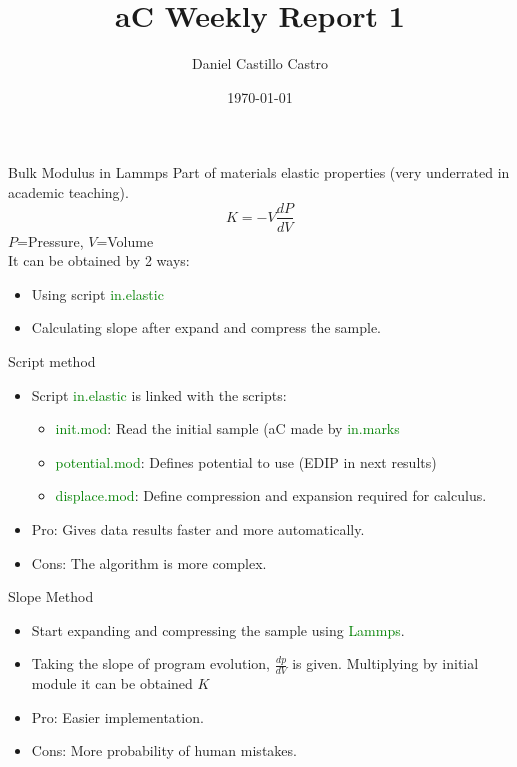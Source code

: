 \documentclass[11pt]{beamer}
\date{\today}
\author[Dacastillo]{Daniel Castillo Castro}
\begin{document}
\everymath{\color{blue}}
\everydisplay{\color{blue}}
\title[aC-WR1]{aC Weekly Report 1} 
\begin{frame}
\titlepage 
\end{frame}
\begin{frame}{Bulk Modulus in Lammps}
Part of materials elastic properties (very underrated in academic teaching).
\begin{equation} \label{Bulk} K=-V\frac{dP}{dV}\end{equation}
$P$=Pressure, $V$=Volume \\
It can be obtained by 2 ways:
\begin{itemize}
    \item Using script \textcolor{green}{in.elastic} 
    \item Calculating slope after expand and compress the sample.
\end{itemize}
\end{frame}
\begin{frame}{Script method}
\begin{itemize}
    \item Script \textcolor{green}{in.elastic} is linked with the scripts:
    \begin{itemize}
        \item \textcolor{green}{init.mod}: Read the initial sample (aC made by \textcolor{green}{in.marks}
        \item \textcolor{green}{potential.mod}: Defines potential to use (EDIP in next results)
        \item \textcolor{green}{displace.mod}: Define compression and expansion required for calculus.
    \end{itemize}
    \item Pro: Gives data results faster and more automatically.
    \item Cons: The algorithm is more complex.
\end{itemize}
\end{frame}
\begin{frame}{Slope Method}
\begin{itemize}
    \item Start expanding and compressing the sample using \textcolor{green}{Lammps}. 
    \item Taking the slope of program evolution, $\frac{dp}{dV}$ is given. Multiplying by initial module it can be obtained $K$
    \item Pro: Easier implementation.
    \item Cons: More probability of human mistakes.
\end{itemize}
\end{frame}
\end{document}
